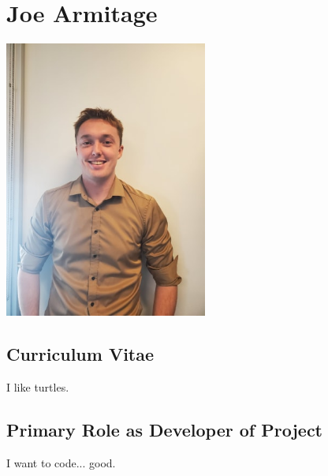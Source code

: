 \section[Joe]{Joe Armitage}

\includegraphics[width=0.5\textwidth]{pic/joe}

\subsection[CV]{Curriculum Vitae}

I like turtles.

\subsection[Role]{Primary Role as Developer of Project}

I want to code... good.

\newpage